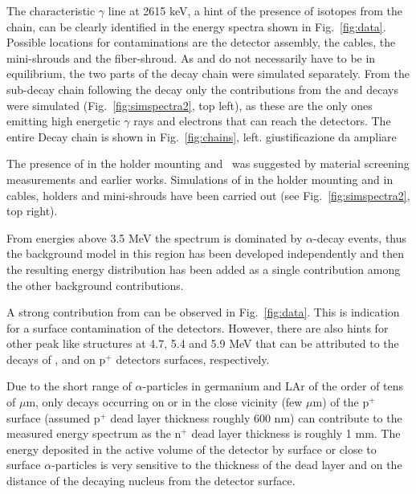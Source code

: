  The characteristic $\gamma$ line at 2615 keV, a hint of the presence of isotopes from the  chain, can be clearly identified in the energy spectra shown in Fig.~\ref{fig:data}. Possible locations for contaminations are the detector assembly, the cables, the mini-shrouds and the fiber-shroud. As  and  do not necessarily have to be in equilibrium, the two parts of the decay chain were simulated separately. From the sub-decay chain following the  decay only the contributions from the  and  decays were simulated (Fig.~\ref{fig:simspectra2}, top left), as these are the only ones emitting high energetic $\gamma$ rays and electrons that can reach the detectors. The entire  Decay chain is shown in Fig.~\ref{fig:chains}, left. {\color{red}giustificazione da ampliare}

 The presence of  in the holder mounting and  was suggested by material screening measurements and earlier works. Simulations of  in the holder mounting and  in cables, holders and mini-shrouds have been carried out (see Fig.~\ref{fig:simspectra2}, top right).

 From energies above 3.5 MeV the spectrum is dominated by $\alpha$-decay events, thus the background model in this region has been developed independently and then the resulting energy distribution has been added as a single contribution among the other background contributions.

A strong contribution from  can be observed in Fig.~\ref{fig:data}. This is indication for a surface contamination of the detectors. However, there are also hints for other peak like structures at 4.7, 5.4 and 5.9 MeV that can be attributed to the decays of ,  and  on p$^+$ detectors surfaces, respectively.

Due to the short range of $\alpha$-particles in germanium and LAr of the order of tens of $\mu$m, only decays occurring on or in the close vicinity (few $\mu$m) of the p$^+$ surface (assumed p$^+$ dead layer thickness roughly 600 nm) can contribute to the measured energy spectrum as the n$^+$ dead layer thickness is roughly 1 mm. The energy deposited in the active volume of the detector by surface or close to surface $\alpha$-particles is very sensitive to the thickness of the dead layer and on the distance of the decaying nucleus from the detector surface.

